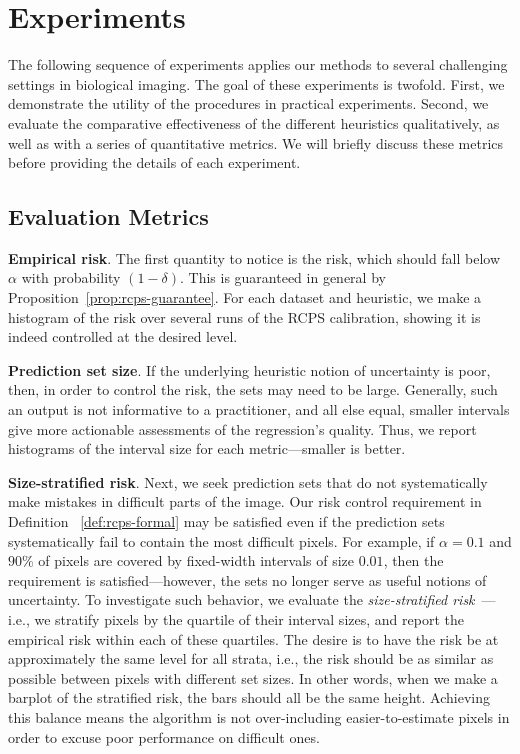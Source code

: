 \documentclass[10pt]{article}
\begin{document}
\section{Experiments}
\label{sec:experiments}

The following sequence of experiments applies our methods to several challenging settings in biological imaging.
The goal of these experiments is twofold.
First, we demonstrate the utility of the procedures in practical experiments.
Second, we evaluate the comparative effectiveness of the different heuristics qualitatively, as well as with a series of quantitative metrics.
We will briefly discuss these metrics before providing the details of each experiment.

\subsection{Evaluation Metrics}
\textbf{Empirical risk}. The first quantity to notice is the risk, which should fall below $\alpha$ with probability $(1 - \delta)$.
This is guaranteed in general by Proposition~\ref{prop:rcps-guarantee}.
For each dataset and heuristic, we make a histogram of the risk over several runs of the RCPS calibration, showing it is indeed controlled at the desired level.

\noindent \textbf{Prediction set size}. If the underlying heuristic notion of uncertainty is poor, then, in order to control the risk, the sets may need to be large.
Generally, such an output is not informative to a practitioner, and all else equal, smaller intervals give more actionable assessments of the regression's quality.
Thus, we report histograms of the interval size for each metric---smaller is better.

\noindent \textbf{Size-stratified risk}. Next, we seek prediction sets that do not systematically make mistakes in difficult parts of the image. 
Our risk control requirement in Definition ~\ref{def:rcps-formal} may be satisfied even if the prediction sets systematically fail to contain the most difficult pixels. 
For example, if $\alpha=0.1$ and $90\%$ of pixels are covered by fixed-width intervals of size $0.01$, then the requirement is satisfied---however, the sets no longer serve as useful notions of uncertainty. 
To investigate such behavior, we evaluate the \emph{size-stratified risk}~\cite{angelopoulos2021gentle}---i.e., we stratify pixels by the quartile of their interval sizes, and report the empirical risk within each of these quartiles.
The desire is to have the risk be at approximately the same level for all strata, i.e., the risk should be as similar as possible between pixels with different set sizes.
In other words, when we make a barplot of the stratified risk, the bars should all be the same height.
Achieving this balance means the algorithm is not over-including easier-to-estimate pixels in order to excuse poor performance on difficult ones.
\end{document}
